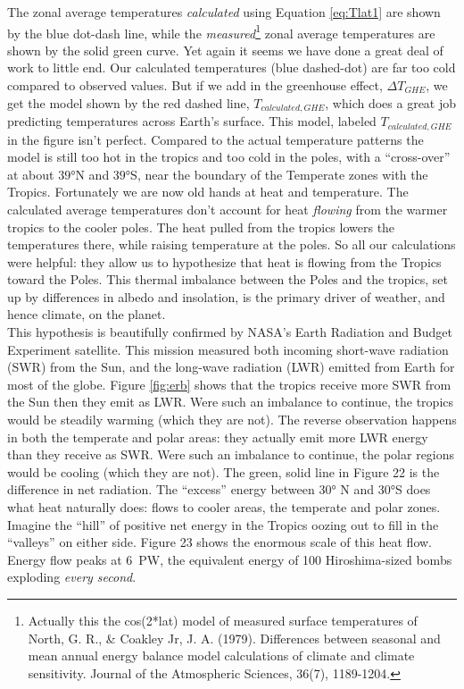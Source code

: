 \documentclass[amstex,12pt]{book}
\begin{document}
The zonal average temperatures \textit{calculated} using Equation \ref{eq:Tlat1} are shown by the blue dot-dash line, while the \textit{measured}\footnote{Actually this the cos(2*lat) model of measured surface temperatures of North, G. R., \& Coakley Jr, J. A. (1979). Differences between seasonal and mean annual energy balance model calculations of climate and climate sensitivity. Journal of the Atmospheric Sciences, 36(7), 1189-1204.} zonal average temperatures are shown by the solid green curve. Yet again it seems we have done a great deal of work to little end. Our calculated temperatures (blue dashed-dot) are far too cold compared to observed values. But if we add in the greenhouse effect, $\Delta T_{GHE}$, we get the model shown by the red dashed line, $T_{calculated, GHE}$, which does a great job predicting temperatures across Earth's surface. This model, labeled $T_{calculated, GHE}$ in the figure isn't perfect. Compared to the actual temperature patterns the model is still too hot in the tropics and too cold in the poles, with a ``cross-over'' at about $\ang{39}$N and $\ang{39}$S, near the boundary of the Temperate zones with the Tropics. Fortunately we are now old hands at heat and temperature. The calculated average temperatures don't account for heat \emph{flowing} from the warmer tropics to the cooler poles. The heat pulled from the tropics lowers the temperatures there, while raising temperature at the poles. So all our calculations were helpful: they allow us to hypothesize that heat is flowing from the Tropics toward the Poles. This thermal imbalance between the Poles and the tropics, set up by differences in albedo and insolation, is the primary driver of weather, and hence climate, on the planet.\\
This hypothesis is beautifully confirmed by NASA's Earth Radiation and Budget Experiment satellite. This mission measured both incoming short-wave radiation (SWR) from the Sun, and the long-wave radiation (LWR) emitted from Earth for most of the globe. Figure \ref{fig:erb} shows that the tropics receive more SWR from the Sun then they emit as LWR. Were such an imbalance to continue, the tropics would be steadily warming (which they are not). The reverse observation happens in both the temperate and polar areas: they actually emit more LWR energy than they receive as SWR. Were such an imbalance to continue, the polar regions would be cooling (which they are not). The green, solid line in Figure 22 is the difference in net radiation. The ``excess'' energy between $\ang{30}$ N and $\ang{30}$S does what heat naturally does: flows to cooler areas, the temperate and polar zones. Imagine the ``hill'' of positive net energy in the Tropics oozing out to fill in the ``valleys'' on either side. Figure 23 shows the enormous scale of this heat flow. Energy flow peaks at \SI{6}{\peta\watt}, the equivalent energy of 100 Hiroshima-sized bombs exploding \emph{every second}.\\
\end{document}
